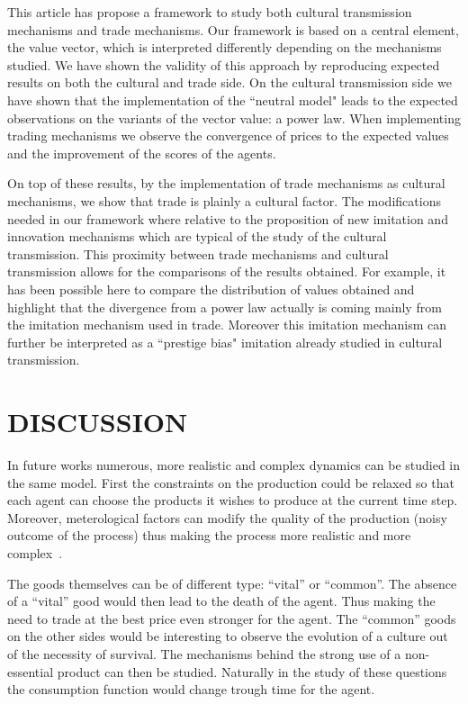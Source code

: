 \documentclass{wscpaperproc}
\begin{document}
This article has propose a framework to study both cultural transmission mechanisms and trade mechanisms. Our framework is based on a central element, the value vector, which is interpreted differently depending on the mechanisms studied. We have shown the validity of this approach by reproducing expected results on both the cultural and trade side. On the cultural transmission side we have shown that the implementation of the ``neutral model" leads to the expected observations on the variants of the vector value: a power law. When implementing trading mechanisms we observe the convergence of prices to the expected values and the improvement of the scores of the agents.

On top of these results, by the implementation of trade mechanisms as cultural mechanisms, we show that trade is plainly a cultural factor. The modifications needed in our framework where relative to the proposition of new imitation and innovation mechanisms which are typical of the study of the cultural transmission. This proximity between trade mechanisms and cultural transmission allows for the comparisons of the results obtained. For example, it has been possible here to compare the distribution of values obtained and highlight that the divergence from a power law actually is coming mainly from the imitation mechanism used in trade. Moreover this imitation mechanism can further be interpreted as a ``prestige bias" imitation already studied in cultural transmission.

\section{DISCUSSION}


In future works numerous, more realistic and complex dynamics can be studied in the same model. First the constraints on the production could be relaxed so that each agent can choose the products it wishes to produce at the current time step. Moreover, meterological factors can modify the quality of the production (noisy outcome of the process) thus making the process more realistic and more complex~\cite{bentley_specialisation_2005}.

The goods themselves can be of different type: ``vital'' or ``common''. The absence of a ``vital'' good would then lead to the death of the agent. Thus making the need to trade at the best price even stronger for the agent. The ``common'' goods on the other sides would be interesting to observe the evolution of a culture out of the necessity of survival. The mechanisms behind the strong use of a non-essential product can then be studied. Naturally in the study of these questions the consumption function would change trough time for the agent.
\end{document}
